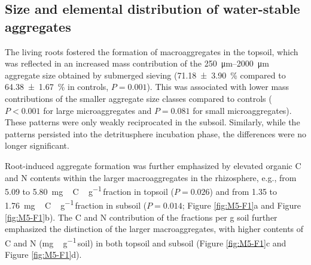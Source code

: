 \subsection{Size and elemental distribution of water-stable aggregates}

The living roots fostered the formation of macroaggregates in the topsoil, which was reflected in an increased mass contribution of the \SIrange{250}{2000}{\micro\metre} aggregate size obtained by submerged sieving (\SI{71.18 \pm 3.90}{\percent} compared to \SI{64.38 \pm 1.67}{\percent} in controls, \(P=0.001\)). This was associated with lower mass contributions of the smaller aggregate size classes compared to controls (\(P < 0.001\) for large microaggregates and \(P=0.081\) for small microaggregates). These patterns were only weakly reciprocated in the subsoil. Similarly, while the patterns persisted into the detritusphere incubation phase, the differences were no longer significant.

Root-induced aggregate formation was further emphasized by elevated organic C and N contents within the larger macroaggregates in the rhizosphere, e.g., from \num{5.09} to \SI{5.80}{mg\,C\,\gram^{-1}}\,fraction in topsoil (\(P=0.026\)) and from \num{1.35} to \SI{1.76}{mg\,C\,\gram^{-1}}\,fraction in subsoil (\(P=0.014\); Figure \ref{fig:M5-F1}a and Figure \ref{fig:M5-F1}b). The C and N contribution of the fractions per g soil further emphasized the distinction of the larger macroaggregates, with higher contents of C and N (\si{mg\,\gram^{-1}}\,soil) in both topsoil and subsoil (Figure \ref{fig:M5-F1}c and Figure \ref{fig:M5-F1}d). 

